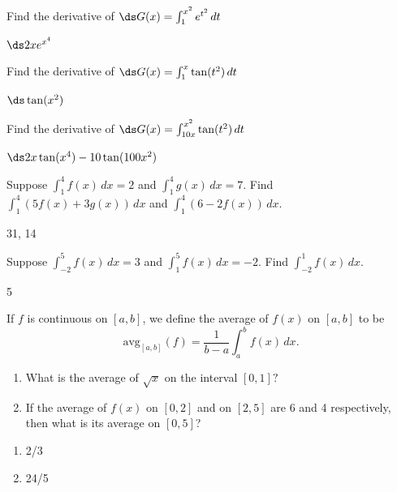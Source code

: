 \begin{enumialphparenastyle}
\begin{ex}
 Find the derivative of $\ds G(x)=\int_1^{x^2} e^{t^2}\,dt$
\begin{sol}
 $\ds 2xe^{x^4}$
\end{sol}
\end{ex}

\begin{ex}
 Find the derivative of $\ds G(x)=\int_1^x \tan(t^2)\,dt$
\begin{sol}
 $\ds \tan(x^2)$
\end{sol}
\end{ex}

\begin{ex}
 Find the derivative of $\ds G(x)=\int_{10x}^{x^2} \tan(t^2)\,dt$
\begin{sol}
 $\ds 2x\tan(x^4)-10\tan(100x^2)$
\end{sol}
\end{ex}

\begin{ex}
Suppose $\int_{1}^{4}f(x)\,dx=2$ and $\int_{1}^{4}g(x)\,dx=7$. Find $\int_{1}^{4}(5f(x)+3g(x))\,dx$ and $\int_{1}^{4}(6-2f(x))\,dx$.
\begin{sol}
	31, 14
\end{sol}
\end{ex}

\begin{ex}
Suppose $\int_{-2}^{5}f(x)\,dx=3$ and $\int_{1}^{5}f(x)\,dx=-2$. Find $\int_{-2}^{1}f(x)\,dx$.
\begin{sol}
	5
\end{sol}
\end{ex}

\begin{ex}
If $f$ is continuous on $[a,b]$, we define the average of $f(x)$ on $[a,b]$ to be
\begin{equation*}
\text{avg}_{[a,b]}(f)=\frac{1}{b-a}\int_{a}^{b}f(x)\,dx.
\end{equation*}
\begin{enumerate}
	\item	What is the average of $\sqrt{x}$ on the interval $[0,1]?$
	\item	If the average of $f(x)$ on $[0,2]$ and on $[2,5]$ are 6 and 4 respectively, then what is its average on $[0,5]$?
\end{enumerate}
\begin{sol}
\begin{enumerate}
	\item	2/3
	\item	24/5
\end{enumerate}
\end{sol}
\end{ex}

\end{enumialphparenastyle}